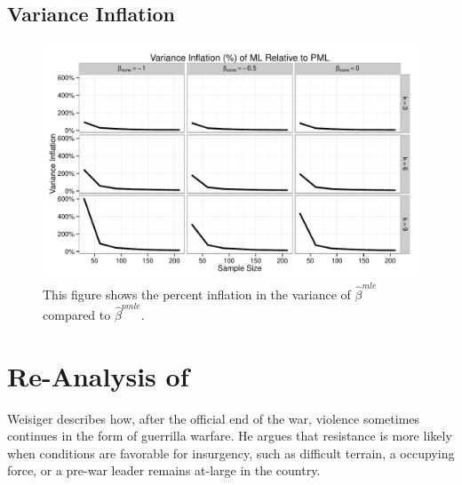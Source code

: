 \documentclass[12pt]{article}
\begin{document}
\begin{appendix}
\subsection{Variance Inflation}

\begin{figure}[H]
\begin{center}
\includegraphics[width = \textwidth]{figs/sims-var-infl.pdf}
\caption{This figure shows the percent inflation in the variance of $\hat{\beta}^{mle}$ compared to $\hat{\beta}^{pmle}$.}\label{fig:var-infl}
\end{center}
\end{figure}

\section*{Re-Analysis of \cite{Weisiger2014}}

Weisiger describes how, after the official end of the war, violence sometimes continues in the form of guerrilla warfare.
He argues that resistance is more likely when conditions are favorable for insurgency, such as difficult terrain, a occupying force, or a pre-war leader remains at-large in the country.


\end{appendix}
\end{document}

